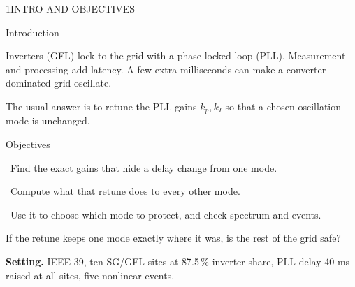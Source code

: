 \begin{minipage}[t][\PosterTopRowHeight][t]{\PosterOneWidth}\vspace{0pt}
  \begin{TicketTwoPanel}{\PosterTopRowHeight}{1}{INTRO AND OBJECTIVES}

    {\Subhead\color{IASDarkGreen}Introduction\par}\vspace{1mm}
    {\FigureSize Inverters (GFL) lock to the grid with a phase-locked loop (PLL). Measurement and processing add latency. A few extra milliseconds can make a converter-dominated grid oscillate.\par}
    \vspace{2mm}
    {\FigureSize The usual answer is to retune the PLL gains $k_p,k_I$ so that a chosen oscillation mode is unchanged.\par}
    \vspace{3mm}
    {\Subhead\color{IASDarkGreen}Objectives\par}\vspace{1mm}
    {\FigureSize
    \ Find the exact gains that hide a delay change from one mode.\par\vspace{1.5mm}
    \ Compute what that retune does to every other mode.\par\vspace{1.5mm}
    \ Use it to choose which mode to protect, and check spectrum and events.\par}
    \vspace{3mm}
    \begin{InWords}\InWordsLabel If the retune keeps one mode exactly where it was, is the rest of the grid safe?\end{InWords}
    \vspace{3mm}
    {\FigureSize \textbf{Setting.} IEEE-39, ten SG/GFL sites at 87.5\,\% inverter share, PLL delay 40 ms raised at all sites, five nonlinear events.\par}

  \end{TicketTwoPanel}
\end{minipage}%
